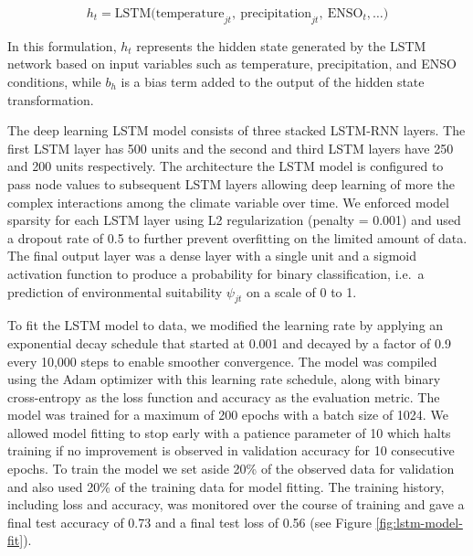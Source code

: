 \documentclass[
]{book}
\begin{document}
\begin{equation}
h_t = \text{LSTM}\big(\text{temperature}_{jt}, \ \text{precipitation}_{jt}, \ \text{ENSO}_{t}, \dots \big)
\end{equation}

In this formulation, \(h_t\) represents the hidden state generated by the LSTM network based on input variables such as temperature, precipitation, and ENSO conditions, while \(b_h\) is a bias term added to the output of the hidden state transformation.

The deep learning LSTM model consists of three stacked LSTM-RNN layers. The first LSTM layer has 500 units and the second and third LSTM layers have 250 and 200 units respectively. The architecture the LSTM model is configured to pass node values to subsequent LSTM layers allowing deep learning of more the complex interactions among the climate variable over time. We enforced model sparsity for each LSTM layer using L2 regularization (penalty = 0.001) and used a dropout rate of 0.5 to further prevent overfitting on the limited amount of data. The final output layer was a dense layer with a single unit and a sigmoid activation function to produce a probability for binary classification, i.e.~a prediction of environmental suitability \(\psi_{jt}\) on a scale of 0 to 1.

To fit the LSTM model to data, we modified the learning rate by applying an exponential decay schedule that started at 0.001 and decayed by a factor of 0.9 every 10,000 steps to enable smoother convergence. The model was compiled using the Adam optimizer with this learning rate schedule, along with binary cross-entropy as the loss function and accuracy as the evaluation metric. The model was trained for a maximum of 200 epochs with a batch size of 1024. We allowed model fitting to stop early with a patience parameter of 10 which halts training if no improvement is observed in validation accuracy for 10 consecutive epochs. To train the model we set aside 20\% of the observed data for validation and also used 20\% of the training data for model fitting. The training history, including loss and accuracy, was monitored over the course of training and gave a final test accuracy of 0.73 and a final test loss of 0.56 (see Figure \ref{fig:lstm-model-fit}).
\end{document}

